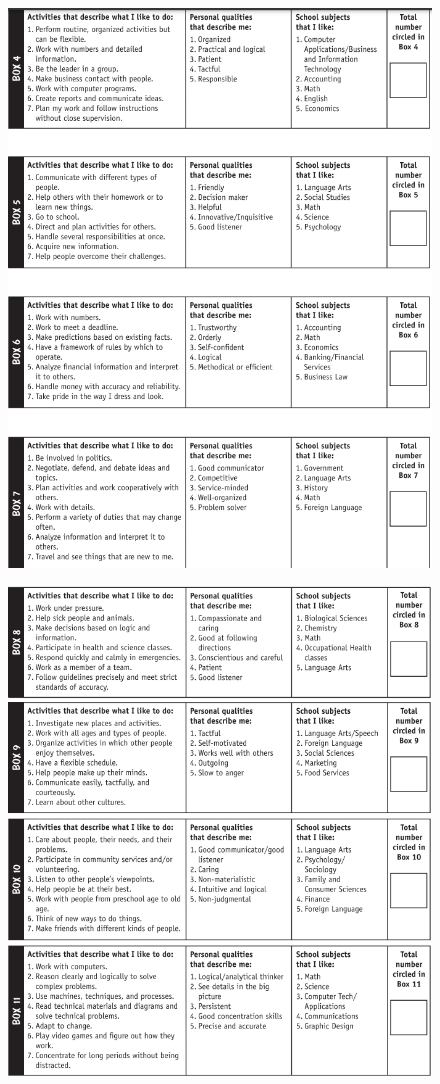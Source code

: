 \begin{figure}[H]
    \centering
    \includegraphics[width=0.9\linewidth]{images/chap3/CC2.png}
\end{figure}

\begin{figure}[H]
    \centering
    \includegraphics[width=0.9\linewidth]{images/chap3/CC3.png}
\end{figure}

